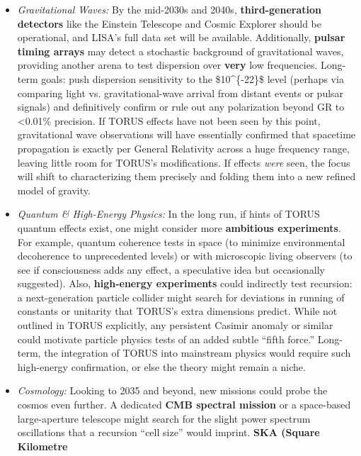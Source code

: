 \documentclass[
]{article}
\begin{document}
\begin{itemize}
  \begin{itemize}
  \item
    \emph{Gravitational Waves:} By the mid-2030s and 2040s,
    \textbf{third-generation detectors} like the Einstein Telescope and
    Cosmic Explorer should be operational, and LISA's full data set will
    be available. Additionally, \textbf{pulsar timing arrays} may detect
    a stochastic background of gravitational waves, providing another
    arena to test dispersion over \textbf{very} low frequencies.
    Long-term goals: push dispersion sensitivity to the
    \$10\^{}\{-22\}\$ level (perhaps via comparing light vs.
    gravitational-wave arrival from distant events or pulsar signals)
    and definitively confirm or rule out any polarization beyond GR to
    \textless0.01\% precision. If TORUS effects have not been seen by
    this point, gravitational wave observations will have essentially
    confirmed that spacetime propagation is exactly per General
    Relativity across a huge frequency range, leaving little room for
    TORUS's modifications. If effects \emph{were} seen, the focus will
    shift to characterizing them precisely and folding them into a new
    refined model of gravity.
  \item
    \emph{Quantum \& High-Energy Physics:} In the long run, if hints of
    TORUS quantum effects exist, one might consider more
    \textbf{ambitious experiments}. For example, quantum coherence tests
    in space (to minimize environmental decoherence to unprecedented
    levels) or with microscopic living observers (to see if
    consciousness adds any effect, a speculative idea but occasionally
    suggested). Also, \textbf{high-energy experiments} could indirectly
    test recursion: a next-generation particle collider might search for
    deviations in running of constants or unitarity that TORUS's extra
    dimensions predict. While not outlined in TORUS explicitly, any
    persistent Casimir anomaly or similar could motivate particle
    physics tests of an added subtle ``fifth force.'' Long-term, the
    integration of TORUS into mainstream physics would require such
    high-energy confirmation, or else the theory might remain a niche.
  \item
    \emph{Cosmology:} Looking to 2035 and beyond, new missions could
    probe the cosmos even further. A dedicated \textbf{CMB spectral
    mission} or a space-based large-aperture telescope might search for
    the slight power spectrum oscillations that a recursion ``cell
    size'' would imprint\hspace{0pt}. \textbf{SKA (Square Kilometre
}
\end{itemize}
\end{itemize}
\end{document}
